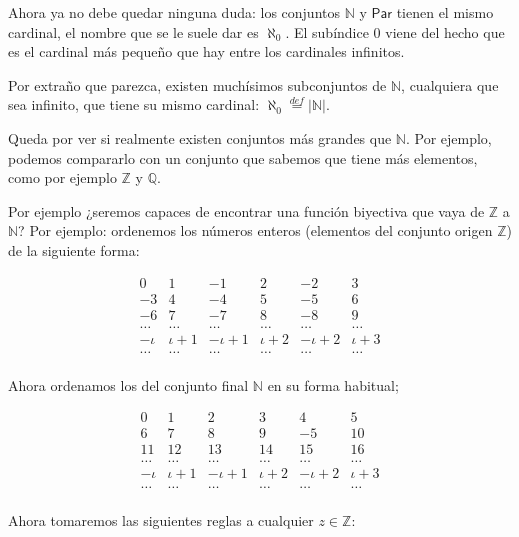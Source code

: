\documentclass{amsart}
\theoremstyle{definition}
\theoremstyle{remark}
\numberwithin{equation}{section}
\newcommand{\abs}[1]{\left\lvert#1\right\rvert}
\newcommand{\setN}{\mathds N}
\newcommand{\setZ}{\mathds Z}
\newcommand{\setQ}{\mathds Q}
\newcommand{\card}[1]{\abs{#1}}
\newcommand{\defin}{\overset {def}{=}}
\begin{document}
	Ahora ya no debe quedar ninguna duda: los conjuntos $\setN$ y 
$\textsf{Par}$ tienen el mismo cardinal, el nombre que se le suele dar es 
$\aleph_0$. El subíndice $0$ viene del hecho que es el cardinal más pequeño 
que hay entre los cardinales infinitos.



	Por extraño que parezca, existen muchísimos subconjuntos de $\setN$, 
cualquiera que sea infinito, que tiene su mismo cardinal: $\aleph_0 \defin 
\card{\setN}$.



	Queda por ver si realmente existen conjuntos más grandes que $\setN$. Por 
ejemplo, podemos compararlo con un conjunto que sabemos que tiene más 
elementos, como por ejemplo $\setZ$ y $\setQ$.



	Por ejemplo ¿seremos capaces de encontrar una función biyectiva que vaya 
de $\setZ$ a $\setN$? Por ejemplo: ordenemos los números enteros (elementos 
del conjunto origen $\setZ$) de la siguiente forma:


$$
\begin{matrix}
  0 & 1 & -1 & 2 & -2 & 3 \\
  -3 & 4 & -4 & 5 & -5 & 6 \\
  -6 & 7 & -7 & 8 & -8 & 9 \\
  \ldots & \ldots & \ldots & \ldots & \ldots & \ldots \\
  -\iota & \iota+1 & -\iota+1 & \iota+2 & -\iota+2 & \iota+3 \\
  \ldots & \ldots & \ldots & \ldots & \ldots & \ldots \\
\end{matrix}
$$


	Ahora ordenamos los del conjunto final $\setN$ en su forma habitual;


$$
\begin{matrix}
  0 & 1 & 2 & 3 & 4 & 5 \\
  6 & 7 & 8 & 9 & -5 & 10 \\
  11 & 12 & 13 & 14 & 15 & 16 \\
  \ldots & \ldots & \ldots & \ldots & \ldots & \ldots \\
  -\iota & \iota+1 & -\iota+1 & \iota+2 & -\iota+2 & \iota+3 \\
  \ldots & \ldots & \ldots & \ldots & \ldots & \ldots \\
\end{matrix}
$$



Ahora tomaremos las siguientes reglas a cualquier $z \in \setZ$:
\end{document}
